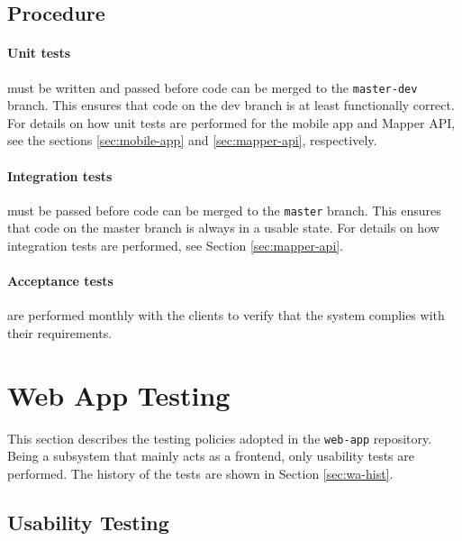\documentclass{article}
\begin{document}
    \subsection{Procedure}
    \label{sec:procedure}

    \paragraph{Unit tests} must be written and passed before code can be merged
    to the \texttt{master-dev} branch. This ensures that code on the dev branch
    is at least functionally correct. For details on how unit tests are
    performed for the mobile app and Mapper API, see the sections
    \ref{sec:mobile-app} and \ref{sec:mapper-api}, respectively.

    \paragraph{Integration tests} must be passed before code can be merged to
    the \texttt{master} branch. This ensures that code on the master branch is
    always in a usable state. For details on how integration tests are
    performed, see Section \ref{sec:mapper-api}.

    \paragraph{Acceptance tests} are performed monthly with the clients to
    verify that the system complies with their requirements.

    \newpage


    \section{Web App Testing}
    \label{sec:web-app}

    This section describes the testing policies adopted in the \texttt{web-app}
    repository. Being a subsystem that mainly acts as a frontend, only
    usability tests are performed. The history of the tests are shown in
    Section \ref{sec:wa-hist}.

    \subsection{Usability Testing}
    \label{sec:wa-tools}
\end{document}
